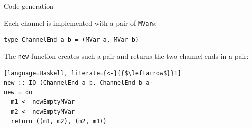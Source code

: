 \documentclass[10pt]{beamer}
\begin{document}

\begin{frame}[fragile]{Code generation}

Each channel is implemented with a pair of \lstinline|MVar|s:
\begin{lstlisting}
type ChannelEnd a b = (MVar a, MVar b)
\end{lstlisting}

\pause
The \lstinline|new| function creates such a pair and returns the two
channel ends in a pair:

\begin{lstlisting}[language=Haskell, literate={<-}{{$\leftarrow$}}1]
new :: IO (ChannelEnd a b, ChannelEnd b a)
new = do
  m1 <- newEmptyMVar
  m2 <- newEmptyMVar
  return ((m1, m2), (m2, m1))
\end{lstlisting}
\end{frame}
\end{document}
